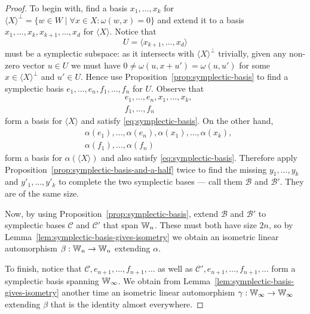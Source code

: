 \begin{proof}
    To begin with, find a basis $x_1, \ldots, x_k$ for $\langle X \rangle^\perp = \{ w \in W \mid \forall x \in X : \omega(w, x) = 0 \}$ 
    and extend it to a basis \(
        x_1, \ldots, x_k, x_{k+1}, \ldots, x_d
    \) for $\langle X \rangle$.
    Notice that
    \[
        U = \langle x_{k+1}, \ldots, x_d \rangle
    \] must be a symplectic subspace:
    as it intersects with $\langle X \rangle^\perp$ trivially, 
    given any non-zero vector $u \in U$ we must have $0 \neq \omega(u, x + u') = \omega(u, u')$ for some $x \in \langle X \rangle^\perp$ and $u' \in U$.
    Hence use Proposition~\ref{prop:symplectic-basis} to find a symplectic basis
    \(
        e_1, \ldots, e_n,
        f_1, \ldots, f_n
    \)
    for $U$.
    Observe that 
    \begin{align*}
        &e_1, \ldots, e_n, x_1, \ldots, x_k, \\
        &f_1, \ldots, f_n
    \end{align*}
    form a basis for $\langle X \rangle$ and satisfy \eqref{eq:symplectic-basis}.
    On the other hand,
    \begin{align*}
        &\alpha(e_1), \ldots, \alpha(e_n), \alpha(x_1), \ldots, \alpha(x_k), \\
        &\alpha(f_1), \ldots, \alpha(f_n)
    \end{align*}
    form a basis for $\alpha(\langle X \rangle)$ and also satisfy \eqref{eq:symplectic-basis}.
    Therefore apply Proposition~\ref{prop:symplectic-basis-and-a-half} twice to find the missing 
    $y_1, \ldots, y_k$ and $y'_1, \ldots, y'_k$ to complete the two symplectic bases --- call them $\mathcal{B}$ and $\mathcal{B}'$.
    They are of the same size.

    Now, by using Proposition~\ref{prop:symplectic-basis}, extend $\mathcal{B}$ and $\mathcal{B}'$ to symplectic bases $\mathcal{C}$ and $\mathcal{C}'$ that span $\mathbb{W}_n$.
    These must both have size $2n$, 
    so by Lemma~\ref{lem:symplectic-basis-gives-isometry} we obtain an isometric linear automorphism $\beta : \mathbb{W}_n \to \mathbb{W}_n$ extending $\alpha$.

    To finish, notice that $\mathcal{C}, e_{n+1}, \ldots, f_{n+1}, \ldots$ as well as $\mathcal{C}', e_{n+1}, \ldots, f_{n+1}, \ldots$ 
    form a symplectic basis spanning $\mathbb{W}_\infty$.
    We obtain from Lemma~\ref{lem:symplectic-basis-gives-isometry} another time an isometric linear automorphism $\gamma : \mathbb{W}_\infty \to \mathbb{W}_\infty$ extending $\beta$ 
    that is the identity almost everywhere.
\end{proof}


